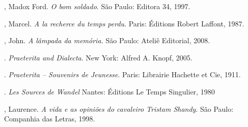 \begin{bibliohedra}
, Madox Ford. \emph{O bom soldado}. São Paulo: Editora 34, 1997.

, Marcel. \emph{A la recherce du temps perdu}. Paris: Éditions
Robert Laffont, 1987.

, John. \emph{A lâmpada da memória.} São Paulo: Ateliê Editorial, 2008.

\titidem. \emph{Praeterita and Dialecta}. New York: Alfred A. Knopf, 2005.

\titidem. \emph{Praeterita -- Souvenirs de Jeunesse}. Paris: Librairie Hachette et Cie, 1911.

\titidem. \emph{Les Sources de Wandel} Nantes: Éditions Le Temps Singulier, 1980

, Laurence. \emph{A vida e as opiniões do cavaleiro Tristam
Shandy}. São Paulo: Companhia das Letras, 1998.
\end{bibliohedra}
